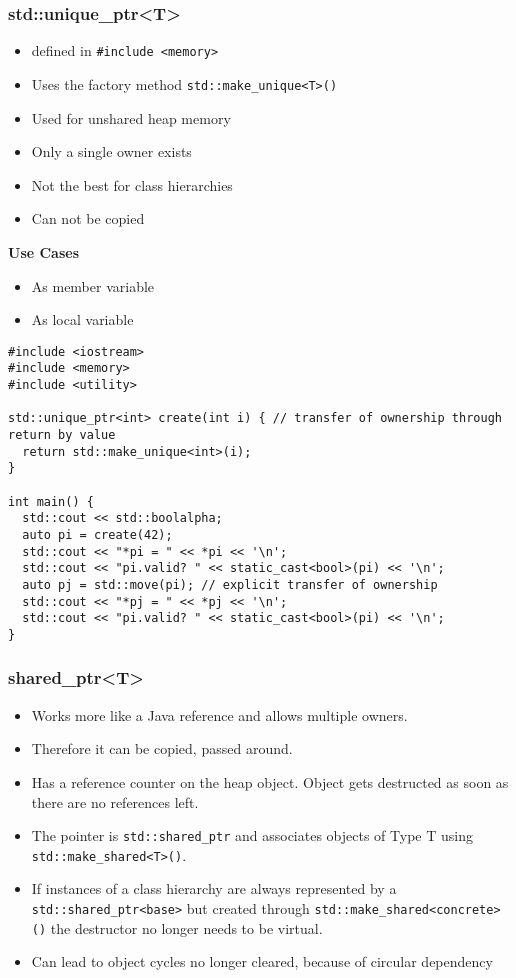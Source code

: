 \subsubsection{std::unique\_ptr<T>}
\begin{itemize}
  \itemsep -0.5em 
  \item defined in \lstinline|#include <memory>|
  \item Uses the factory method \lstinline|std::make_unique<T>()|
  \item Used for unshared heap memory
  \item Only a single owner exists
  \item Not the best for class hierarchies
  \item Can not be copied
\end{itemize}

\textbf{Use Cases}
\begin{itemize}
  \itemsep -0.5em 
  \item As member variable
  \item As local variable
\end{itemize}

\begin{lstlisting}
#include <iostream>
#include <memory>
#include <utility>

std::unique_ptr<int> create(int i) { // transfer of ownership through return by value
  return std::make_unique<int>(i); 
}

int main() {
  std::cout << std::boolalpha;
  auto pi = create(42);
  std::cout << "*pi = " << *pi << '\n';
  std::cout << "pi.valid? " << static_cast<bool>(pi) << '\n';
  auto pj = std::move(pi); // explicit transfer of ownership
  std::cout << "*pj = " << *pj << '\n';
  std::cout << "pi.valid? " << static_cast<bool>(pi) << '\n';
}
\end{lstlisting}


\subsubsection{shared\_ptr<T>}
\begin{itemize}
	\itemsep -0.5em
	\item Works more like a Java reference and allows multiple owners.
	\item Therefore it can be copied, passed around.
	\item Has a reference counter on the heap object. Object gets destructed as soon as there are no references left.
	\item The pointer is \lstinline|std::shared_ptr| and associates objects of Type T using \lstinline|std::make_shared<T>()|.
	\item If instances of a class hierarchy are always represented by a \lstinline|std::shared_ptr<base>| but created through \lstinline|std::make_shared<concrete>()| the destructor no longer needs to be virtual.
	\item Can lead to object cycles no longer cleared, because of circular dependency
\end{itemize}


